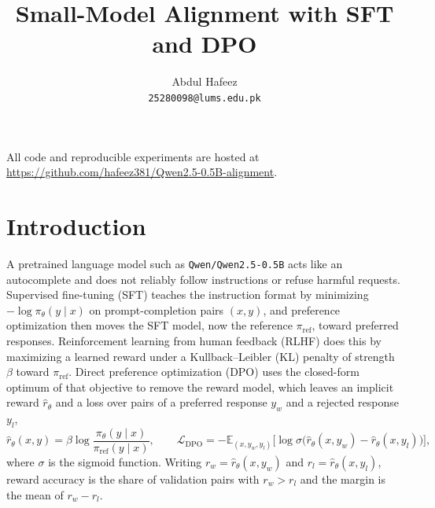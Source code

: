 \documentclass{article}
\title{Small-Model Alignment with SFT and DPO}
\author{%
  Abdul Hafeez \\
  \texttt{25280098@lums.edu.pk}
}
\begin{document}
\maketitle

\vspace{-1em}
All code and reproducible experiments are hosted at \url{https://github.com/hafeez381/Qwen2.5-0.5B-alignment}.

\section{Introduction}
\label{sec:intro}

A pretrained language model such as \texttt{Qwen/Qwen2.5-0.5B} acts like an autocomplete and does not reliably follow instructions or refuse harmful requests. Supervised fine-tuning (SFT) teaches the instruction format by minimizing $-\log\pi_\theta(y\mid x)$ on prompt-completion pairs $(x,y)$, and preference optimization then moves the SFT model, now the reference $\pi_{\text{ref}}$, toward preferred responses. Reinforcement learning from human feedback (RLHF) \citep{ouyang2022training} does this by maximizing a learned reward under a Kullback--Leibler (KL) penalty of strength $\beta$ toward $\pi_{\text{ref}}$. Direct preference optimization (DPO) \citep{rafailov2023direct} uses the closed-form optimum of that objective to remove the reward model, which leaves an implicit reward $\hat r_\theta$ and a loss over pairs of a preferred response $y_w$ and a rejected response $y_l$,
\begin{equation*}
  \hat r_\theta(x,y)=\beta\log\frac{\pi_\theta(y\mid x)}{\pi_{\text{ref}}(y\mid x)},\qquad
  \mathcal{L}_{\text{DPO}}=-\mathbb{E}_{(x,y_w,y_l)}\Big[\log\sigma\big(\hat r_\theta(x,y_w)-\hat r_\theta(x,y_l)\big)\Big],
\end{equation*}
where $\sigma$ is the sigmoid function. Writing $r_w=\hat r_\theta(x,y_w)$ and $r_l=\hat r_\theta(x,y_l)$, reward accuracy is the share of validation pairs with $r_w>r_l$ and the margin is the mean of $r_w-r_l$.
\end{document}
